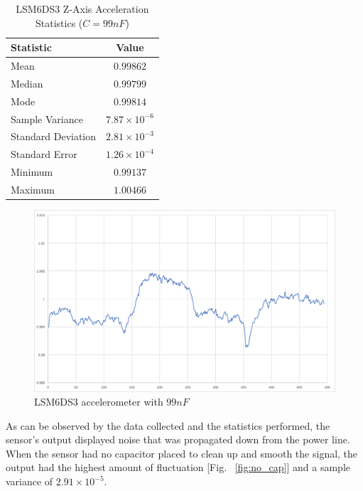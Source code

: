 \begin{table}[H]
\caption{\label{tab:99nF} LSM6DS3 Z-Axis Acceleration Statistics ($C=99nF$)}
\centering
\begin{tabular}{l|c}
\hline\hline
\textbf{Statistic}      & \textbf{Value}            \\\hline
Mean                    & $0.99862$                 \\\hline
Median                  & $0.99799$                 \\\hline
Mode  	                & $0.99814$                 \\\hline
Sample Variance         & $7.87\times10^{\minus6}$  \\\hline
Standard Deviation      & $2.81\times10^{\minus3}$  \\\hline
Standard Error  	    & $1.26\times10^{\minus4}$  \\\hline
Minimum                 & $0.99137$                 \\\hline
Maximum                 & $1.00466$                 \\\hline
\end{tabular}
\end{table}

\begin{figure}[ht]
  \centering
  \includegraphics[width=1.0\textwidth]{Controls/99nF.png}
  \caption{\label{fig:99nF} LSM6DS3 accelerometer with $99nF$}
\end{figure}


As can be observed by the data collected and the statistics performed, the sensor's output displayed noise that was propagated down from the power line. When the sensor had no capacitor placed to clean up and smooth the signal, the output had the highest amount of fluctuation [Fig. ~\ref{fig:no_cap}] and a sample variance of $2.91\times10^{\minus5}$.

